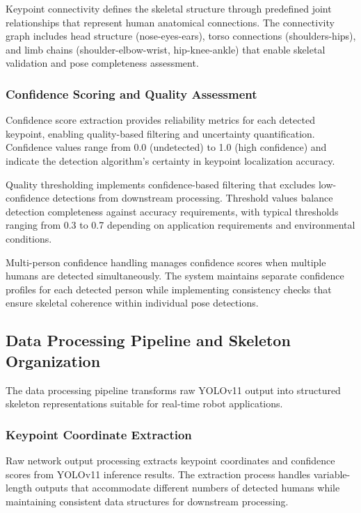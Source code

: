 Keypoint connectivity defines the skeletal structure through predefined joint relationships that represent human anatomical connections. The connectivity graph includes head structure (nose-eyes-ears), torso connections (shoulders-hips), and limb chains (shoulder-elbow-wrist, hip-knee-ankle) that enable skeletal validation and pose completeness assessment.

\subsubsection{Confidence Scoring and Quality Assessment}

Confidence score extraction provides reliability metrics for each detected keypoint, enabling quality-based filtering and uncertainty quantification. Confidence values range from 0.0 (undetected) to 1.0 (high confidence) and indicate the detection algorithm's certainty in keypoint localization accuracy.

Quality thresholding implements confidence-based filtering that excludes low-confidence detections from downstream processing. Threshold values balance detection completeness against accuracy requirements, with typical thresholds ranging from 0.3 to 0.7 depending on application requirements and environmental conditions.

Multi-person confidence handling manages confidence scores when multiple humans are detected simultaneously. The system maintains separate confidence profiles for each detected person while implementing consistency checks that ensure skeletal coherence within individual pose detections.

\subsection{Data Processing Pipeline and Skeleton Organization}

The data processing pipeline transforms raw YOLOv11 output into structured skeleton representations suitable for real-time robot applications.

\subsubsection{Keypoint Coordinate Extraction}

Raw network output processing extracts keypoint coordinates and confidence scores from YOLOv11 inference results. The extraction process handles variable-length outputs that accommodate different numbers of detected humans while maintaining consistent data structures for downstream processing.

